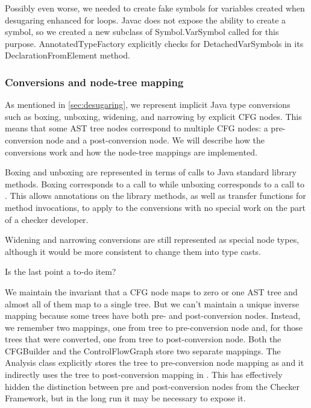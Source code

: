 Possibly even worse, we needed to create fake symbols for variables
created when desugaring enhanced for loops.  Javac does not expose the
ability to create a symbol, so we created a new subclass of
Symbol.VarSymbol called  for
this purpose.  AnnotatedTypeFactory explicitly checks for
DetachedVarSymbols in its DeclarationFromElement method.



\subsubsection{Conversions and node-tree mapping}
\label{sec:conversions}

As mentioned in \autoref{sec:desugaring}, we represent implicit Java
type conversions such as boxing, unboxing, widening, and narrowing by
explicit CFG nodes.  This means that some AST tree nodes correspond to
multiple CFG nodes: a pre-conversion node and a post-conversion node.
We will describe how the conversions work and how the node-tree
mappings are implemented.

Boxing and unboxing are represented in terms of calls to Java standard
library methods.  Boxing corresponds to a call to
 while unboxing corresponds to a call to
.  This allows annotations on the library
methods, as well as transfer functions for method invocations, to
apply to the conversions with no special work on the part of a checker
developer.

Widening and narrowing conversions are still represented as special
node types, although it would be more consistent to change them into
type casts.

\begin{workinprogress}
Is the last point a to-do item?
\end{workinprogress}

We maintain the invariant that a CFG node maps to zero or one AST tree
and almost all of them map to a single tree.  But we can't maintain a
unique inverse mapping because some trees have both pre- and
post-conversion nodes.  Instead, we remember two mappings, one from
tree to pre-conversion node and, for those trees that were converted,
one from tree to post-conversion node.  Both the CFGBuilder and the
ControlFlowGraph store two separate mappings.  The Analysis class
explicitly stores the tree to pre-conversion node mapping as
 and it indirectly uses the tree to post-conversion
mapping in .  This has effectively
hidden the distinction between pre and post-conversion nodes from the
Checker Framework, but in the long run it may be necessary to expose
it.



